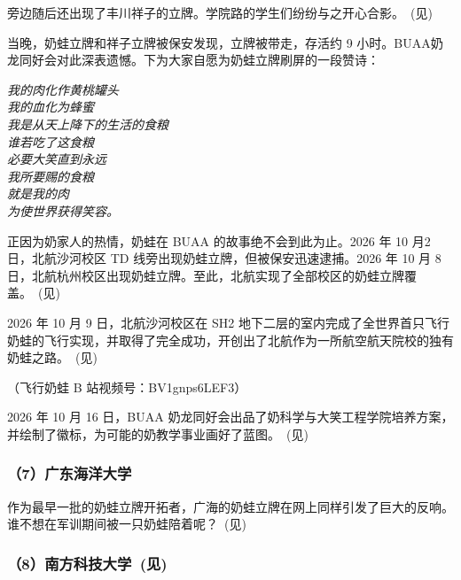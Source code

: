 旁边随后还出现了丰川祥子的立牌。学院路的学生们纷纷与之开心合影。~(见)



当晚，奶蛙立牌和祥子立牌被保安发现，立牌被带走，存活约 9 小时。BUAA奶龙同好会对此深表遗憾。下为大家自愿为奶蛙立牌刷屏的一段赞诗：

\begin{center}
\itshape
\fontsize{10.5}{13}\selectfont
我的肉化作黄桃罐头\\
我的血化为蜂蜜\\
我是从天上降下的生活的食粮\\
谁若吃了这食粮\\
必要大笑直到永远\\
我所要赐的食粮\\
就是我的肉\\
为使世界获得笑容。
\end{center}

正因为奶家人的热情，奶蛙在 BUAA 的故事绝不会到此为止。2026 年 10 月2 日，北航沙河校区 TD 线旁出现奶蛙立牌，但被保安迅速逮捕。2026 年 10 月 8日，北航杭州校区出现奶蛙立牌。至此，北航实现了全部校区的奶蛙立牌覆盖。~(见)

\clearpage


2026 年 10 月 9 日，北航沙河校区在 SH2 地下二层的室内完成了全世界首只飞行奶蛙的飞行实现，并取得了完全成功，开创出了北航作为一所航空航天院校的独有奶蛙之路。~(见)

（飞行奶蛙 B 站视频号：BV1gnps6LEF3）



2026 年 10 月 16 日，BUAA 奶龙同好会出品了奶科学与大笑工程学院培养方案，并绘制了徽标，为可能的奶教学事业画好了蓝图。~(见)



\clearpage
\subsubsection{（7）广东海洋大学}

作为最早一批的奶蛙立牌开拓者，广海的奶蛙立牌在网上同样引发了巨大的反响。谁不想在军训期间被一只奶蛙陪着呢？~(见)



\subsubsection[（8）南方科技大学]{（8）南方科技大学~(见)}

